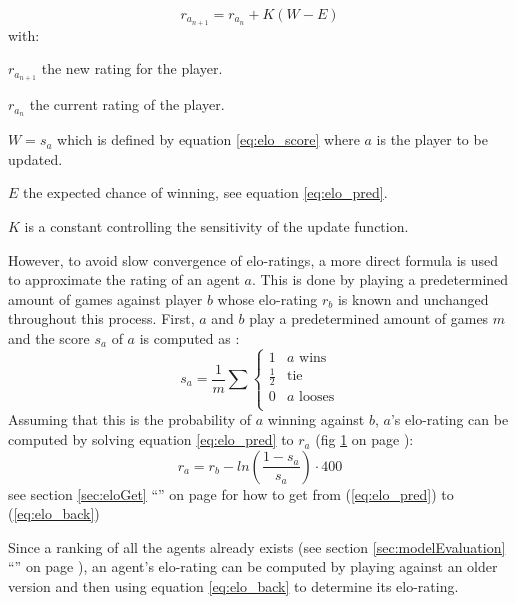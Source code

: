 \documentclass[12pt]{article}
\newcommand{\imgRef}[1]{(fig \ref{#1} on page \pageref{#1})}
\newcommand{\sectionref}[1]{section \ref{#1} ``\nameref{#1}'' on page \pageref{#1}}
\newcommand{\quckeq}[1]{(\ref{#1})}
\newcommand{\quickeq}[1]{\quckeq{#1}}
\begin{document}
\begin{equation} \label{eq:elo_update}
r_{a_{n+1}} = r_{a_n} + K(W - E)
\end{equation}
with:
\begin{description}
\item \(r_{a_{n+1}}\) the new rating for the player.
\item \(r_{a_n}\) the current rating of the player.
\item \(W = s_a\) which is defined by equation \ref{eq:elo_score} where \(a\) is the player to be updated.
\item \(E\) the expected chance of winning, see equation \ref{eq:elo_pred}.
\item \(K\) is a constant controlling the sensitivity of the update function.
\end{description}
However, to avoid slow convergence of elo-ratings, a more direct formula is used to approximate the rating of an agent \(a\). This is done by playing a predetermined amount of games against player \(b\) whose elo-rating \(r_b\) is known and unchanged throughout this process. First, \(a\) and \(b\) play a predetermined amount of games \(m\) and the score \(s_a\) of \(a\) is computed as \cite{elo1978rating}:
\begin{equation} \label{eq:elo_score}
s_a = \frac{1}{m}\sum\left\{
\begin{array}{ll}
1 &              a\textrm{ wins} \\
\frac{1}{2} & \textrm{tie}\\
0 &              a\textrm{ looses}\\
\end{array}
\right.
\end{equation}
Assuming that this is the probability of \(a\) winning against \(b\), \(a\)'s elo-rating can be computed by solving equation \ref{eq:elo_pred} to \(r_a\) \imgRef{fig:eloInv}:
\begin{equation} \label{eq:elo_back}
r_a = r_b - ln\left(\frac{1-s_a}{s_a}\right) \cdot 400
\end{equation}
see \sectionref{sec:eloGet} for how to get from \quickeq{eq:elo_pred} to \quickeq{eq:elo_back}
\begin{figure}
\center

\label{fig:eloInv}
\end{figure}
Since a ranking of all the agents already exists (see \sectionref{sec:modelEvaluation}), an agent's elo-rating can be computed by playing against an older version and then using equation \ref{eq:elo_back} to determine its elo-rating. 
\end{document}
